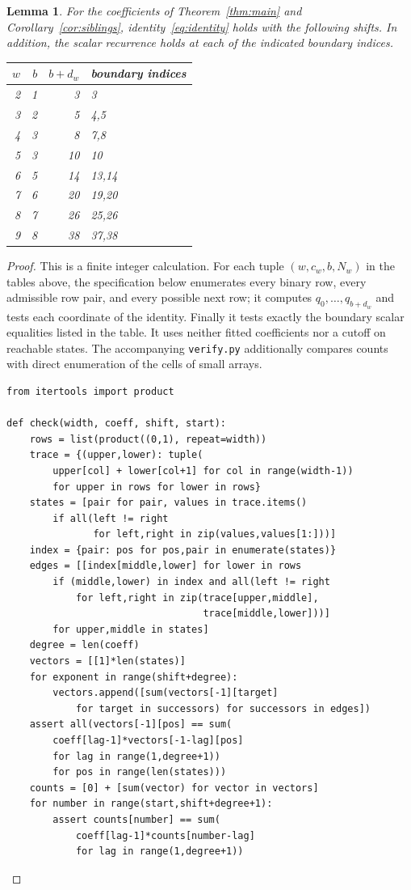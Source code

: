 \documentclass[11pt]{article}
\newtheorem{lemma}[theorem]{Lemma}
\begin{document}
\begin{lemma}\label{lem:finite}
For the coefficients of Theorem~\ref{thm:main} and
Corollary~\ref{cor:siblings}, identity~\eqref{eq:identity}
holds with the following shifts. In addition, the scalar recurrence holds
at each of the indicated boundary indices.
\begin{center}
\begin{tabular}{rrrl}
\toprule
$w$&$b$&$b+d_w$&boundary indices\\
\midrule
2&1&3&3\\
3&2&5&4,5\\
4&3&8&7,8\\
5&3&10&10\\
6&5&14&13,14\\
7&6&20&19,20\\
8&7&26&25,26\\
9&8&38&37,38\\
\bottomrule
\end{tabular}
\end{center}
\end{lemma}
\begin{proof}
This is a finite integer calculation. For each tuple
$(w,c_w,b,N_w)$ in the tables above, the specification below
enumerates every binary row, every admissible row pair, and every possible
next row; it computes $q_0,\ldots,q_{b+d_w}$ and tests each coordinate of
the identity. Finally it tests exactly the boundary scalar equalities
listed in the table. It uses neither fitted coefficients nor a cutoff on
reachable states. The accompanying \texttt{verify.py} additionally
compares counts with direct enumeration of the cells of small arrays.

\begin{Verbatim}[fontsize=\small]
from itertools import product

def check(width, coeff, shift, start):
    rows = list(product((0,1), repeat=width))
    trace = {(upper,lower): tuple(
        upper[col] + lower[col+1] for col in range(width-1))
        for upper in rows for lower in rows}
    states = [pair for pair, values in trace.items()
        if all(left != right
               for left,right in zip(values,values[1:]))]
    index = {pair: pos for pos,pair in enumerate(states)}
    edges = [[index[middle,lower] for lower in rows
        if (middle,lower) in index and all(left != right
            for left,right in zip(trace[upper,middle],
                                  trace[middle,lower]))]
        for upper,middle in states]
    degree = len(coeff)
    vectors = [[1]*len(states)]
    for exponent in range(shift+degree):
        vectors.append([sum(vectors[-1][target]
            for target in successors) for successors in edges])
    assert all(vectors[-1][pos] == sum(
        coeff[lag-1]*vectors[-1-lag][pos]
        for lag in range(1,degree+1))
        for pos in range(len(states)))
    counts = [0] + [sum(vector) for vector in vectors]
    for number in range(start,shift+degree+1):
        assert counts[number] == sum(
            coeff[lag-1]*counts[number-lag]
            for lag in range(1,degree+1))
\end{Verbatim}
\end{proof}
\end{document}
